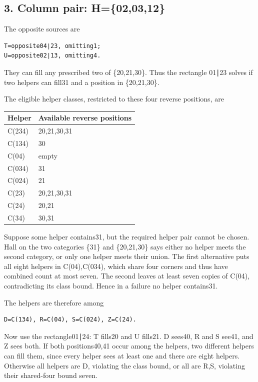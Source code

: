 \documentclass[
  10pt,
]{article}
\begin{document}
\hypertarget{column-pair-h020312}{%
\subsection*{3. Column pair: H=\{02,03,12\}}\label{column-pair-h020312}}

The opposite sources are

\begin{verbatim}
T=opposite04∣23, omitting1;
U=opposite02∣13, omitting4.
\end{verbatim}

They can fill any prescribed two of \{20,21,30\}. Thus the rectangle
01∣23 solves if two helpers can fill31 and a position in \{20,21,30\}.

The eligible helper classes, restricted to these four reverse positions,
are

\begin{longtable}[]{@{}ll@{}}
\toprule\noalign{}
Helper & Available reverse positions \\
\midrule\noalign{}
\endhead
\bottomrule\noalign{}
\endlastfoot
C(234) & 20,21,30,31 \\
C(134) & 30 \\
C(04) & empty \\
C(034) & 31 \\
C(024) & 21 \\
C(23) & 20,21,30,31 \\
C(24) & 20,21 \\
C(34) & 30,31 \\
\end{longtable}

Suppose some helper contains31, but the required helper pair cannot be
chosen. Hall on the two categories \{31\} and \{20,21,30\} says either
no helper meets the second category, or only one helper meets their
union. The first alternative puts all eight helpers in C(04),C(034),
which share four corners and thus have combined count at most seven. The
second leaves at least seven copies of C(04), contradicting its class
bound. Hence in a failure no helper contains31.

The helpers are therefore among

\begin{verbatim}
D=C(134), R=C(04), S=C(024), Z=C(24).
\end{verbatim}

Now use the rectangle01∣24: T fills20 and U fills21. D sees40, R and S
see41, and Z sees both. If both positions40,41 occur among the helpers,
two different helpers can fill them, since every helper sees at least
one and there are eight helpers. Otherwise all helpers are D, violating
the class bound, or all are R,S, violating their shared-four bound
seven.
\end{document}
